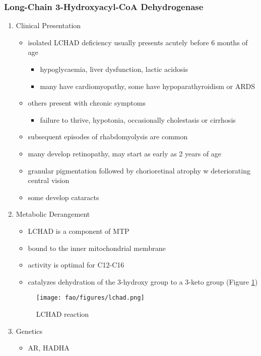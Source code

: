 \documentclass[12pt]{scrartcl}
\begin{document}
\subsubsection{Long-Chain 3-Hydroxyacyl-CoA Dehydrogenase}
\label{sec:org1af1f10}
\begin{enumerate}
\item Clinical Presentation
\label{sec:orgd36de5a}
\begin{itemize}
\item isolated LCHAD deficiency usually presents acutely before 6 months of age
\begin{itemize}
\item hypoglycaemia, liver dysfunction, lactic acidosis
\item many have cardiomyopathy, some have hypoparathyroidism or ARDS
\end{itemize}
\item others present with chronic symptoms
\begin{itemize}
\item failure to thrive, hypotonia, occasionally cholestasis or cirrhosis
\end{itemize}
\item subsequent episodes of rhabdomyolysis are common
\item many develop retinopathy, may start as early as 2 years of age
\item granular pigmentation followed by chorioretinal atrophy w deteriorating central vision
\item some develop cataracts
\end{itemize}
\item Metabolic Derangement
\label{sec:org5b4e298}
\begin{itemize}
\item LCHAD is a component of MTP
\item bound to the inner mitochondrial membrane
\item activity is optimal for C12-C16
\item catalyzes dehydration of the 3-hydroxy group to a 3-keto group
(Figure \ref{fig:orgd9bf6ac})
\end{itemize}
\begin{figure}[htbp]
\centering
\texttt{[image: fao/figures/lchad.png]}
\caption{\label{fig:orgd9bf6ac}LCHAD reaction}
\end{figure}

\item Genetics
\label{sec:orgab8427a}
\begin{itemize}
\item AR, HADHA
\end{itemize}


\end{enumerate}
\end{document}
